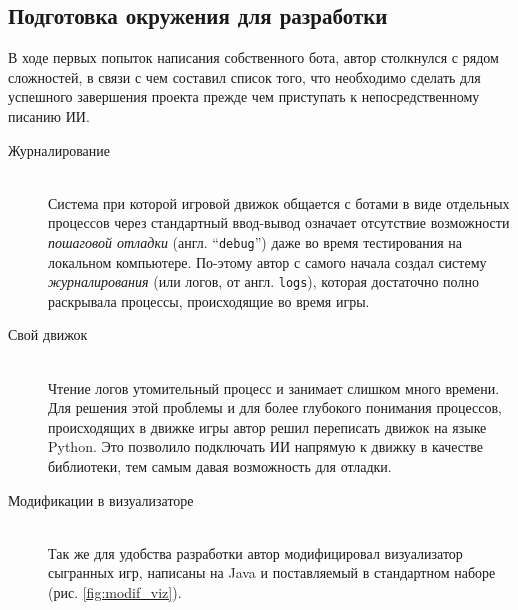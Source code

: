 \documentclass[12pt]{report}
\begin{document}
\subsection{Подготовка окружения для разработки}
В ходе первых попыток написания собственного бота, автор столкнулся с рядом сложностей, в связи с чем составил список того, что необходимо сделать для успешного завершения проекта прежде чем приступать к непосредственному писанию ИИ.
\begin{description}
\item[Журналирование] \hfill \\ Система при которой игровой движок общается с ботами в виде отдельных процессов через стандартный ввод-вывод означает отсутствие возможности \emph{пошаговой отладки}  (англ. ``\texttt{debug}'') даже во время тестирования на локальном компьютере. По-этому автор с самого начала создал систему \emph{журналирования} (или логов, от англ. \texttt{logs}), которая достаточно полно раскрывала процессы, происходящие во время игры.
\item[Свой движок] \hfill \\ Чтение логов утомительный процесс и занимает слишком много времени. Для решения этой проблемы и для более глубокого понимания процессов, происходящих в движке игры автор решил переписать движок на языке Python. Это позволило подключать ИИ напрямую к движку в качестве библиотеки, тем самым давая возможность для отладки.
\item[Модификации в визуализаторе] \hfill \\ Так же для удобства разработки автор модифицировал визуализатор сыгранных игр, написаны на Java и поставляемый в стандартном  наборе (рис. \ref{fig:modif_viz}). 


\end{description}
\end{document}
